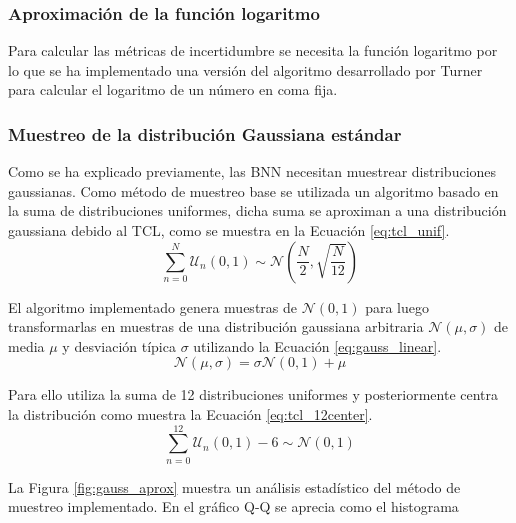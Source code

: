 \subsubsection{Aproximación de la función logaritmo}

Para calcular las métricas de incertidumbre se necesita la función logaritmo por lo que se ha implementado una versión del algoritmo desarrollado por Turner \cite{binary_log} para calcular el logaritmo de un número en coma fija.

\subsubsection{Muestreo de la distribución Gaussiana estándar}

Como se ha explicado previamente, las BNN necesitan muestrear distribuciones gaussianas. Como método de muestreo base se utilizada un algoritmo basado en la suma de distribuciones uniformes, dicha suma se aproximan a una distribución gaussiana debido al TCL, como se muestra en la Ecuación \ref{eq:tcl_unif}.
\begin{equation} \label{eq:tcl_unif}
\sum_{n=0}^{N} \mathcal{U}_n(0,1) \sim \mathcal{N} \left( \dfrac{N}{2}, \sqrt{\dfrac{N}{12}} \right)
\end{equation}

El algoritmo implementado genera muestras de $\mathcal{N}(0,1)$ para luego transformarlas en muestras de una distribución gaussiana arbitraria $\mathcal{N}(\mu, \sigma)$ de media $\mu$ y desviación típica $\sigma$ utilizando la Ecuación \ref{eq:gauss_linear}.
\begin{equation} \label{eq:gauss_linear}
\mathcal{N}(\mu, \sigma) = \sigma \mathcal{N}(0,1) + \mu
\end{equation}

Para ello utiliza la suma de 12 distribuciones uniformes y posteriormente centra la distribución como muestra la Ecuación \ref{eq:tcl_12center}.
\begin{equation} \label{eq:tcl_12center}
\sum_{n=0}^{12} \mathcal{U}_n(0,1) - 6 \sim \mathcal{N}(0,1)
\end{equation}

La Figura \ref{fig:gauss_aprox} muestra un análisis estadístico del método de muestreo implementado. En el gráfico Q-Q se aprecia como el histograma 

